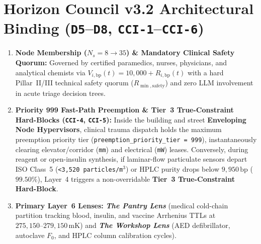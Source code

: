 \section{Horizon Council v3.2 Architectural Binding (\texttt{D5}--\texttt{D8}, \texttt{CCI-1}--\texttt{CCI-6})}
\begin{enumerate}
    \item \textbf{Node Membership ($N_s = 8 \to 35$) \& Mandatory Clinical Safety Quorum:} Governed by certified paramedics, nurses, physicians, and analytical chemists via $V_{i,\mathrm{bp}}(t) = 10{,}000 + R_{i,\mathrm{bp}}(t)$ with a hard Pillar~II/III technical safety quorum ($R_{\min,\mathrm{safety}}$) and zero LLM involvement in acute triage decision trees.
    \item \textbf{Priority 999 Fast-Path Preemption \& Tier~3 True-Constraint Hard-Blocks (\texttt{CCI-4}, \texttt{CCI-5}):} Inside the building and street \textbf{Enveloping Node Hypervisors}, clinical trauma dispatch holds the maximum preemption priority tier (\texttt{preemption\_priority\_tier = 999}), instantaneously clearing elevator/corridor (\texttt{mm}) and electrical (\texttt{mW}) leases. Conversely, during reagent or open-insulin synthesis, if laminar-flow particulate sensors depart ISO Class~5 (\texttt{<3,520 particles/m}$^3$) or HPLC purity drops below $9{,}950\,\mathrm{bp}$ ($99.50\%$), Layer~4 triggers a non-overridable \textbf{Tier~3 True-Constraint Hard-Block}.
    \item \textbf{Primary Layer~6 Lenses:} \textbf{\textit{The Pantry Lens}} (medical cold-chain partition tracking blood, insulin, and vaccine Arrhenius TTLs at $275{,}150\text{--}279{,}150\,\mathrm{mK}$) and \textbf{\textit{The Workshop Lens}} (AED defibrillator, autoclave $F_0$, and HPLC column calibration cycles).
\end{enumerate}

